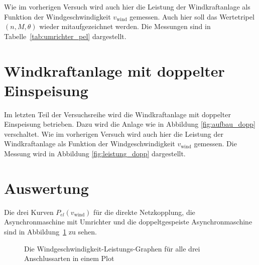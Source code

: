 \documentclass{report}
\begin{document}
Wie im vorherigen Versuch wird auch hier die Leistung der Windkraftanlage als Funktion der Windgeschwindigkeit $v_{\mathrm{wind}}$ gemessen. Auch hier soll das Wertetripel $(n, M, \theta)$ wieder mitaufgezeichnet werden. Die Messungen sind in Tabelle~\ref{tab:umrichter_pel} dargestellt.

\section{Windkraftanlage mit doppelter Einspeisung}
\label{sec:windkr-mit-dopp}

Im letzten Teil der Versuchsreihe wird die Windkraftanlage mit doppelter Einspeisung betrieben. Dazu wird die Anlage wie in Abbildung \ref{fig:aufbau_dopp} verschaltet. Wie im vorherigen Versuch wird auch hier die Leistung der Windkraftanlage als Funktion der Windgeschwindigkeit $v_{\mathrm{wind}}$ gemessen. Die Messung wird in Abbildung \ref{fig:leistung_dopp} dargestellt.


\section{Auswertung}
\label{sec:auswertung}

Die drei Kurven $P_{el}(v_{\mathrm{wind}})$ für die direkte Netzkopplung, die Asynchronmaschine mit Umrichter und die doppeltgespeiste Asynchronmaschine sind in Abbildung~\ref{fig:auswertung_pel} zu sehen.

\begin{figure}[!ht]
  \centering

  \caption{Die Windgeschwindigkeit-Leistungs-Graphen für alle drei Anschlussarten in einem Plot}
  \label{fig:auswertung_pel}
\end{figure}

\end{document}

